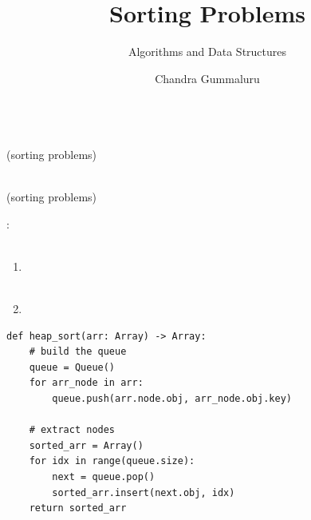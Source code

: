 \documentclass[mathserif, handout]{beamer}
\title{Sorting Problems}
\subtitle{Algorithms and Data Structures}
\author[C. Gummaluru]{Chandra Gummaluru}
\institute[]{\url{chandra-gummaluru.github.io} }
\date[Algorithms and Data Structures]{}
\begin{document}
\begin{frame}
  \maketitle
\end{frame}

\begin{frame}
  \begin{center}
    \Large {} \\[1mm]
    \normalsize \color{gray} (sorting problems)
  \end{center}
\end{frame}

\begin{frame}
  \begin{center}
    \Large {} \\[1mm]
    \normalsize \color{gray} (sorting problems)
  \end{center}
\end{frame}

\begin{frame}
  \vspace{-6mm}
  \begin{proofbox}
    : \\
     \\[-4mm]
    \begin{enumerate}
      \item {} \\
             \\

      \item {} \\
    \end{enumerate}
  \end{proofbox}
\end{frame}

\begin{frame}[fragile]
  \begin{proofbox}
    \begin{lstlisting}[style=mypython]
def heap_sort(arr: Array) -> Array:
    # build the queue
    queue = Queue()
    for arr_node in arr:
        queue.push(arr.node.obj, arr_node.obj.key)

    # extract nodes
    sorted_arr = Array()
    for idx in range(queue.size):
        next = queue.pop()
        sorted_arr.insert(next.obj, idx)
    return sorted_arr
\end{lstlisting}
  \end{proofbox}
\end{frame}
\end{document}
